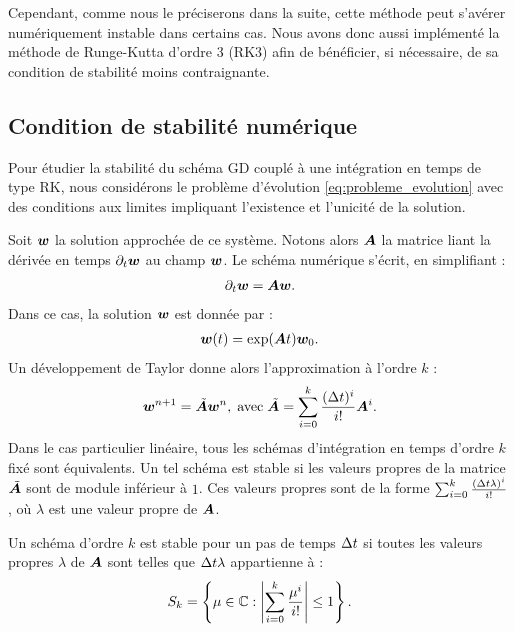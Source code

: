 Cependant, comme nous le préciserons dans la suite, cette méthode peut
s'avérer numériquement instable dans certains cas.
Nous avons donc aussi implémenté la méthode de Runge-Kutta d’ordre $3$ (RK$3$)
afin de bénéficier, si nécessaire, de sa condition de stabilité moins contraignante.
\\


\subsection{Condition de stabilité numérique}
\label{ssect:stabilite_numerique}

Pour étudier la stabilité du schéma GD couplé à une intégration en temps
de type RK,
nous considérons le problème d'évolution \eqref{eq:probleme_evolution} avec des
conditions aux limites impliquant l’existence et l’unicité de la solution.

Soit $\bm{w}$ la solution approchée de ce système. Notons alors $\bm{A}$ la matrice
liant la dérivée en temps $\partial_{t}\bm{w}$ au champ $\bm{w}$. Le schéma numérique
s’écrit, en simplifiant :
\begin{align}
	\partial_{t}\bm{w} = \bm{A} \bm{w} .
\end{align}
Dans ce cas, la solution $\bm{w}$ est donnée par :
\begin{align}
	\bm{w}(t) = \exp(\bm{A} t) \bm{w}_0 .
\end{align}
Un développement de Taylor donne alors l’approximation à l'ordre $k$ :
\begin{align}
	\bm{w}^{n+1} = \tilde{\bm{A}} \bm{w}^n ,
	\; \mathrm{avec} \;
	\tilde{\bm{A}} = \sum_{i=0}^{k} \frac{(\Delta t)^i}{i!} \bm{A}^i
	\label{eq:developpement_taylor} .
\end{align}
Dans le cas particulier linéaire, tous les schémas d’intégration en temps d'ordre $k$ fixé
sont équivalents. Un tel schéma est stable si les valeurs propres
de la matrice $\tilde{\bm{A}}$ sont de module inférieur à $1$.
Ces valeurs propres sont de la forme
$\sum_{i=0}^{k} \frac{(\Delta t \lambda)^i}{i!}$, où $\lambda$ est une valeur
propre de $\bm{A}$.
\begin{proposition} \label{prop:stabilite}
	Un schéma d’ordre $k$ est stable pour un pas de temps $\Delta t$ si toutes les
	valeurs propres $\lambda$ de $\bm{A}$ sont telles que $\Delta t \lambda$
	appartienne à :
	\begin{align}
		S_k = \left \{
			\mu \in \mathbb{C} : \left\vert\sum_{i=0}^{k} \frac{\mu^i}{i!}\right\vert \le 1
		\right \} .
	\end{align}
\end{proposition}

